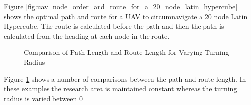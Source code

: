 \documentclass[a4paper,12pt,twoside]{article}
\begin{document}
Figure \ref{fig:uav_node_order_and_route_for_a_20_node_latin_hypercube} shows the optimal path and route for a UAV to circumnavigate a 20 node Latin Hypercube. The route is calculated before the path and then the path is calculated from the heading at each node in the route.

\begin{figure}[H]
	\centering
	
	\caption{Comparison of Path Length and Route Length for Varying Turning Radius}
	\label{fig:comparison_of_path_length_and_route_length_for_varying_turning_radius}
\end{figure}

Figure \ref{fig:comparison_of_path_length_and_route_length_for_varying_turning_radius} shows a number of comparisons between the path and route length. In these examples the research area is maintained constant whereas the turning radius is varied between 0%
\end{document}
